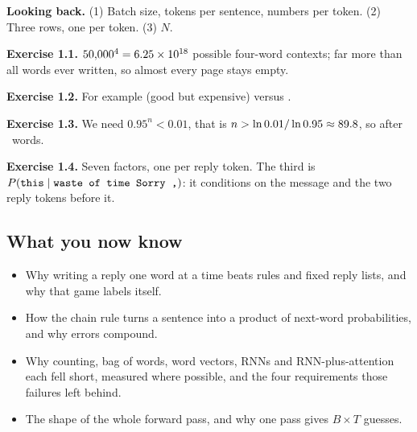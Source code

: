 \textbf{Looking back.} (1) Batch size, tokens per sentence, numbers per token. (2) Three rows, one per token.
(3) $N$.

\textbf{Exercise 1.1.} $50{,}000^4 = 6.25\times10^{18}$ possible four-word contexts; far more than all words ever
written, so almost every page stays empty.

\textbf{Exercise 1.2.} For example  (good but expensive) versus .

\textbf{Exercise 1.3.} We need $0.95^n < 0.01$, that is $n > \ln 0.01/\ln 0.95 \approx 89.8$, so after
\hExNceil\ words.

\textbf{Exercise 1.4.} Seven factors, one per reply token. The third is $P(\texttt{this}\mid\texttt{waste of time Sorry ,})$:
it conditions on the message and the two reply tokens before it.
\normalsize

\subsection*{What you now know}
\begin{itemize}
\item Why writing a reply one word at a time beats rules and fixed reply lists, and why that game labels itself.
\item How the chain rule turns a sentence into a product of next-word probabilities, and why errors compound.
\item Why counting, bag of words, word vectors, RNNs and RNN-plus-attention each fell short, measured where
possible, and the four requirements those failures left behind.
\item The shape of the whole forward pass, and why one pass gives $B\times T$ guesses.
\end{itemize}

